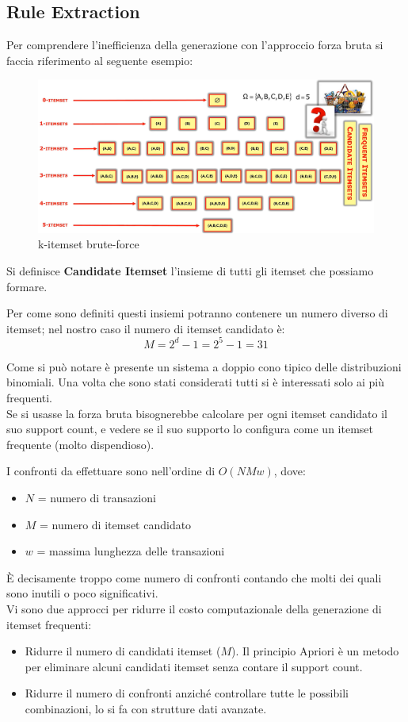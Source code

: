 \subsection{Rule Extraction}

Per comprendere l'inefficienza della generazione con l'approccio forza bruta si faccia riferimento al seguente esempio:
\begin{figure}[H]
	\centering
	\includegraphics[width= \linewidth]{association/pict/k-itemset.png}
	\caption{k-itemset brute-force}
\end{figure}
\begin{defn}
	Si definisce \textbf{Candidate Itemset} l'insieme di tutti gli itemset che possiamo formare. 
\end{defn}
Per come sono definiti questi insiemi potranno contenere un numero diverso di itemset; nel nostro caso il numero di itemset candidato è: 
\[M = 2^{d} - 1 = 2^5 -1 = 31\]

Come si può notare è presente un sistema a doppio cono tipico delle distribuzioni binomiali. Una volta che sono stati considerati tutti si è interessati solo ai più frequenti. \\
Se si usasse la forza bruta bisognerebbe calcolare per ogni itemset candidato il suo support count, e vedere se il suo supporto lo configura come un itemset frequente (molto dispendioso). 

I confronti da effettuare sono nell'ordine di $O(NMw)$, dove:
\begin{itemize}
	\item $N$ = numero di transazioni
	\item $M$ = numero di itemset candidato
	\item $w$ = massima lunghezza delle transazioni
\end{itemize} 
È decisamente troppo come numero di confronti contando che molti dei quali sono inutili o poco significativi.
\\ Vi sono due approcci per ridurre il costo computazionale della generazione di itemset frequenti:
\begin{itemize}
	\item Ridurre il numero di candidati itemset ($M$). Il principio Apriori è un metodo per eliminare alcuni candidati itemset senza contare il support count. 
	\item Ridurre il numero di confronti anziché controllare tutte le possibili combinazioni, lo si fa con strutture dati avanzate.
\end{itemize}

